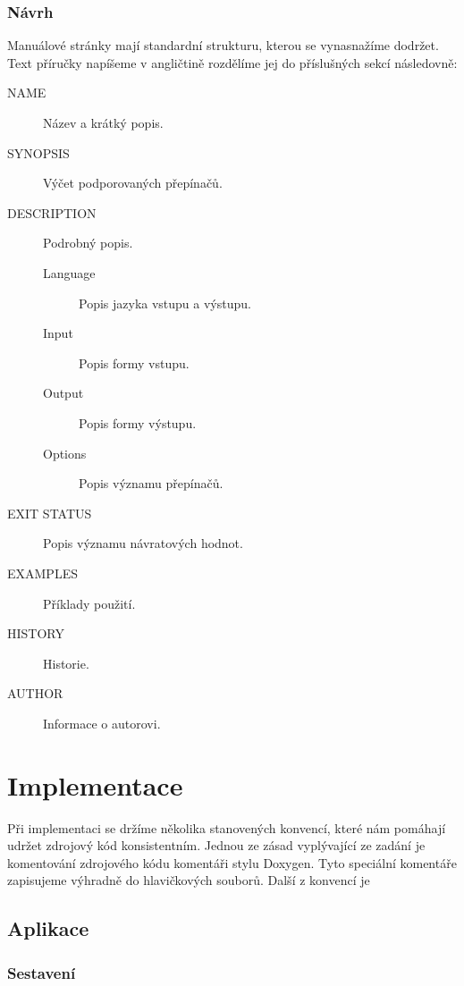\documentclass[thesis=B,czech,hidelinks]{FITthesis}[2012/06/26]
\begin{document}
\subsection{Návrh}

Manuálové stránky mají standardní strukturu, kterou se vynasnažíme dodržet. Text příručky napíšeme v angličtině rozdělíme jej do příslušných sekcí následovně:

\begin{description}
	\item[NAME]  Název a krátký popis.
	\item[SYNOPSIS] Výčet podporovaných přepínačů.
	\item[DESCRIPTION] Podrobný popis.
	\begin{description}
		\item[Language] Popis jazyka vstupu a výstupu.
		\item[Input] Popis formy vstupu.
		\item[Output] Popis formy výstupu.
		\item[Options] Popis významu přepínačů.
	\end{description}
	\item[EXIT STATUS] Popis významu návratových hodnot.
	\item[EXAMPLES] Příklady použití.
	\item[HISTORY] Historie.
	\item[AUTHOR] Informace o autorovi.
\end{description}

%
%
%

\chapter{Implementace}

Při implementaci se držíme několika stanovených konvencí, které nám pomáhají udržet zdrojový kód konsistentním. Jednou ze zásad vyplývající ze zadání je komentování zdrojového kódu komentáři stylu Doxygen. Tyto speciální komentáře zapisujeme výhradně do hlavičkových souborů. Další z konvencí je 

\section{Aplikace}

\subsection{Sestavení}
\end{document}

